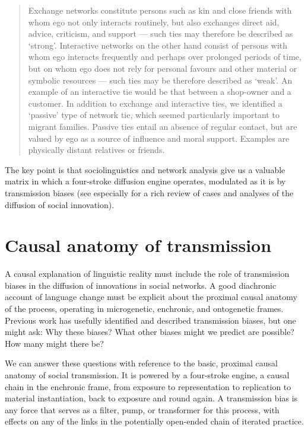 \begin{quotation}
Exchange networks constitute persons such as kin and close friends with whom ego not only interacts routinely, but also exchanges direct aid, advice, criticism, and support --- such ties may therefore be described as \textquoteleft strong'.  Interactive networks on the other hand consist of persons with whom ego interacts frequently and perhaps over prolonged periods of time, but on whom ego does not rely for personal favours and other material or symbolic resources --- such ties may be therefore described as \textquoteleft weak'. An example of an interactive tie would be that between a shop-owner and a customer. In addition to exchange and interactive ties, we identified a \textquoteleft passive' type of network tie, which seemed particularly important to migrant families. Passive ties entail an absence of regular contact, but are valued by ego as a source of influence and moral support. Examples are physically distant relatives or friends. \citep[138-139]{milroy_social_1995}
\end{quotation}

The key point is that sociolinguistics and network analysis give us a valuable matrix in which a four-stroke diffusion engine operates, modulated as it is by transmission biases (see especially \citealt{rogers_diffusion_2003} for a rich review of cases and analyses of the diffusion of social innovation).

\section{Causal anatomy of transmission}



A causal explanation of linguistic reality must include the role of transmission biases in the diffusion of innovations in social networks. A good diachronic account of language change must be explicit about the proximal causal 
anatomy of the process, operating in microgenetic, enchronic, and ontogenetic frames. Previous work has usefully identified and 
described transmission biases, but one might ask: Why these biases? What 
other biases might we predict are possible? How many might there be? 



We can answer these questions with reference to the basic, proximal causal anatomy of social transmission. It is powered by a four-stroke engine, a causal chain in the enchronic frame, from 
exposure to representation to replication to material instantiation, 
back to exposure and round again. A transmission 
bias is any force that serves as a filter, pump, or transformer for this 
process, with effects on any of the links in the potentially open-ended chain of iterated practice. 

